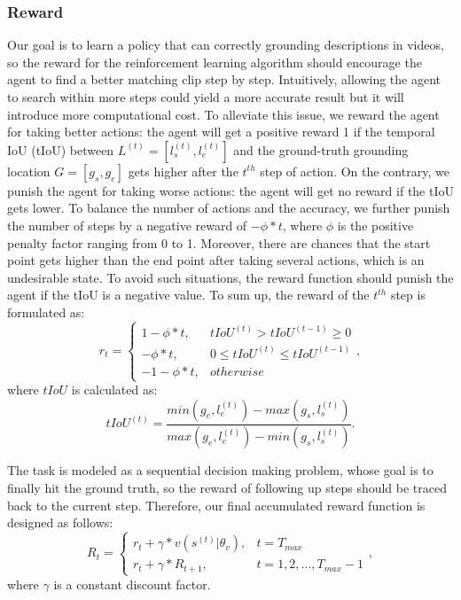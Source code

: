 \documentclass[letterpaper]{article} %
\begin{document}
\subsubsection{Reward}
Our goal is to learn a policy that can correctly grounding descriptions in videos, so the reward for the reinforcement learning algorithm should encourage the agent to find a better matching clip step by step. Intuitively, allowing the agent to search within more steps could yield a more accurate result but it will introduce more computational cost. To alleviate this issue, we reward the agent for taking better actions:
the agent will get a positive reward 1 if the temporal IoU (tIoU) between $L^{(t)}=[l_s^{(t)}, l_e^{(t)}]$ and the ground-truth grounding location $G = [g_s, g_e]$ gets higher after the $t^{th}$ step of action. On the contrary, we punish the agent for taking worse actions: the agent  will get no reward if the tIoU gets lower. To balance the number of actions and the accuracy, we further punish the number of steps by a negative reward of $-\phi * t$, where $\phi$ is the positive penalty factor ranging from 0 to 1. Moreover, there are chances that the start point gets higher than the end point after taking several actions, which is an undesirable state. To avoid such situations, the reward function should punish the agent if the tIoU is a negative value.
To sum up, the reward of the $t^{th}$ step is formulated as:
\begin{equation}
r_t =
\begin{cases}
{1-\phi * t,} & {tIoU^{(t)} > tIoU^{(t-1)}} \geq 0 \\
{-\phi * t}, &  0 \leq {tIoU^{(t)} \leq tIoU^{(t-1)}} \\
{-1-\phi * t,} & otherwise
\end{cases},
\end{equation}
where $tIoU$ is calculated as:
\begin{equation}
tIoU^{(t)} = \frac{min(g_e,l_e^{(t)})-max(g_s,l_s^{(t)})}{max(g_e,l_e^{(t)})-min(g_s,l_s^{(t)})}.
\end{equation}

The task is modeled as a sequential decision making problem, whose goal is to finally hit the ground truth, so the reward of following up steps should be traced back to the current step. Therefore, our final accumulated reward function is designed as follows:
\begin{equation}
R_t =
\begin{cases}
r_t + \gamma*v(s^{(t)}|\theta_v), & t = T_{max} \\
r_t + \gamma*R_{t+1}, & t=1,2,...,T_{max}-1
\end{cases},
\end{equation}
where $\gamma$ is a constant discount factor.
\end{document}
